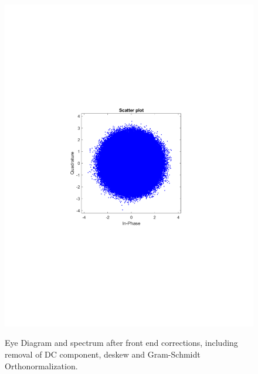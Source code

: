 \begin{refsection}
\begin{figure}[H]
\begin{minipage}{0.30\textwidth}
		\includegraphics[clip, trim=4cm 8cm 4cm 8cm, width=1\textwidth]{./sdf/m_qam_system/figures/expResults/intradyne/1_const_16GBdInSig13dB_AfFec.pdf}
		\label{fig:16GBdSpecBefFec}
	\end{minipage}
	\caption{Eye Diagram and spectrum after front end corrections, including removal of DC component, deskew and Gram-Schmidt Orthonormalization.}
\end{figure}


\end{refsection}
